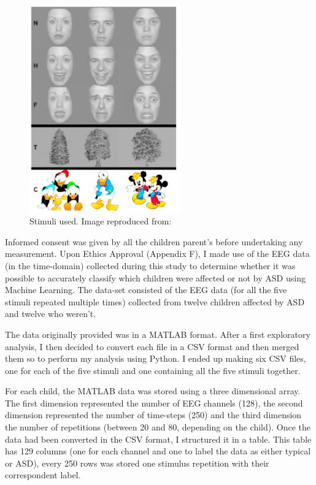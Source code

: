 \begin{figure}[ht!]%
    \centering
    \includegraphics[width=6.5cm]{images/stimolus.PNG}%
    \caption{Stimuli used. Image reproduced from: \cite{pisa}}
\end{figure}

Informed consent was given by all the children parent's before undertaking any measurement. Upon Ethics Approval (Appendix F), I made use of the EEG data (in the time-domain) collected during this study to determine whether it was possible to accurately classify which children were affected or not by ASD using Machine Learning. The data-set consisted of the EEG data (for all the five stimuli repeated multiple times) collected from twelve children affected by ASD and twelve who weren't. 

The data originally provided was in a MATLAB format. After a first exploratory analysis, I then decided to convert each file in a CSV format and then merged them so to perform my analysis using Python. I ended up making six CSV files, one for each of the five stimuli and one containing all the five stimuli together.

For each child, the MATLAB data was stored using a three dimensional array. The first dimension represented the number of EEG channels (128), the second dimension represented the number of time-steps (250) and the third dimension the number of repetitions (between 20 and 80, depending on the child). Once the data had been converted in the CSV format, I structured it in a table. This table has 129 columns (one for each channel and one to label the data as either typical or ASD), every 250 rows was stored one stimulus repetition with their correspondent label.

